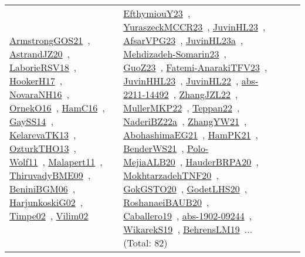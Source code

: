 {\begin{longtable}{lp{3cm}>{\raggedright\arraybackslash}p{6cm}>{\raggedright\arraybackslash}p{6cm}>{\raggedright\arraybackslash}p{8cm}}
\href{../works/ArmstrongGOS21.pdf}{ArmstrongGOS21}~\cite{ArmstrongGOS21}, \href{../works/AstrandJZ20.pdf}{AstrandJZ20}~\cite{AstrandJZ20}, \href{../works/LaborieRSV18.pdf}{LaborieRSV18}~\cite{LaborieRSV18}, \href{../works/HookerH17.pdf}{HookerH17}~\cite{HookerH17}, \href{../works/NovaraNH16.pdf}{NovaraNH16}~\cite{NovaraNH16}, \href{../works/OrnekO16.pdf}{OrnekO16}~\cite{OrnekO16}, \href{../works/HamC16.pdf}{HamC16}~\cite{HamC16}, \href{../works/GaySS14.pdf}{GaySS14}~\cite{GaySS14}, \href{../works/KelarevaTK13.pdf}{KelarevaTK13}~\cite{KelarevaTK13}, \href{../works/OzturkTHO13.pdf}{OzturkTHO13}~\cite{OzturkTHO13}, \href{../works/Wolf11.pdf}{Wolf11}~\cite{Wolf11}, \href{../works/Malapert11.pdf}{Malapert11}~\cite{Malapert11}, \href{../works/ThiruvadyBME09.pdf}{ThiruvadyBME09}~\cite{ThiruvadyBME09}, \href{../works/BeniniBGM06.pdf}{BeniniBGM06}~\cite{BeniniBGM06}, \href{../works/HarjunkoskiG02.pdf}{HarjunkoskiG02}~\cite{HarjunkoskiG02}, \href{../works/Timpe02.pdf}{Timpe02}~\cite{Timpe02}, \href{../works/Vilim02.pdf}{Vilim02}~\cite{Vilim02} & \href{../works/EfthymiouY23.pdf}{EfthymiouY23}~\cite{EfthymiouY23}, \href{../works/YuraszeckMCCR23.pdf}{YuraszeckMCCR23}~\cite{YuraszeckMCCR23}, \href{../works/JuvinHL23.pdf}{JuvinHL23}~\cite{JuvinHL23}, \href{../works/AfsarVPG23.pdf}{AfsarVPG23}~\cite{AfsarVPG23}, \href{../works/JuvinHL23a.pdf}{JuvinHL23a}~\cite{JuvinHL23a}, \href{../works/Mehdizadeh-Somarin23.pdf}{Mehdizadeh-Somarin23}~\cite{Mehdizadeh-Somarin23}, \href{../works/GuoZ23.pdf}{GuoZ23}~\cite{GuoZ23}, \href{../works/Fatemi-AnarakiTFV23.pdf}{Fatemi-AnarakiTFV23}~\cite{Fatemi-AnarakiTFV23}, \href{../works/JuvinHHL23.pdf}{JuvinHHL23}~\cite{JuvinHHL23}, \href{../works/JuvinHL22.pdf}{JuvinHL22}~\cite{JuvinHL22}, \href{../works/abs-2211-14492.pdf}{abs-2211-14492}~\cite{abs-2211-14492}, \href{../works/ZhangJZL22.pdf}{ZhangJZL22}~\cite{ZhangJZL22}, \href{../works/MullerMKP22.pdf}{MullerMKP22}~\cite{MullerMKP22}, \href{../works/Teppan22.pdf}{Teppan22}~\cite{Teppan22}, \href{../works/NaderiBZ22a.pdf}{NaderiBZ22a}~\cite{NaderiBZ22a}, \href{../works/ZhangYW21.pdf}{ZhangYW21}~\cite{ZhangYW21}, \href{../works/AbohashimaEG21.pdf}{AbohashimaEG21}~\cite{AbohashimaEG21}, \href{../works/HamPK21.pdf}{HamPK21}~\cite{HamPK21}, \href{../works/BenderWS21.pdf}{BenderWS21}~\cite{BenderWS21}, \href{../works/Polo-MejiaALB20.pdf}{Polo-MejiaALB20}~\cite{Polo-MejiaALB20}, \href{../works/HauderBRPA20.pdf}{HauderBRPA20}~\cite{HauderBRPA20}, \href{../works/MokhtarzadehTNF20.pdf}{MokhtarzadehTNF20}~\cite{MokhtarzadehTNF20}, \href{../works/GokGSTO20.pdf}{GokGSTO20}~\cite{GokGSTO20}, \href{../works/GodetLHS20.pdf}{GodetLHS20}~\cite{GodetLHS20}, \href{../works/RoshanaeiBAUB20.pdf}{RoshanaeiBAUB20}~\cite{RoshanaeiBAUB20}, \href{../works/Caballero19.pdf}{Caballero19}~\cite{Caballero19}, \href{../works/abs-1902-09244.pdf}{abs-1902-09244}~\cite{abs-1902-09244}, \href{../works/WikarekS19.pdf}{WikarekS19}~\cite{WikarekS19}, \href{../works/BehrensLM19.pdf}{BehrensLM19}~\cite{BehrensLM19}... (Total: 82)\\

\end{longtable}}
